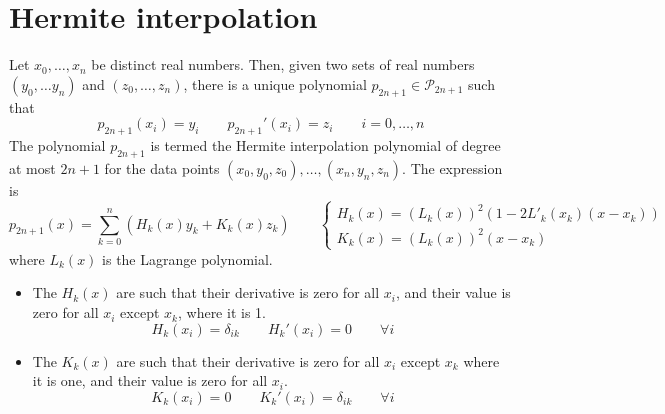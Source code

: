 \documentclass[12pt, openany]{report}
\begin{document}
\section{Hermite interpolation}
Let \(x_0,\dots,x_n\) be distinct real numbers. Then, given two sets of real numbers \((y_0,\dots y_n)\) and \((z_0,\dots,z_n)\), there is a unique polynomial \(p_{2n+1}\in \mathcal{P}_{2n+1}\) such that 
\begin{equation}
    p_{2n+1} (x_i) = y_i \qquad p_{2n+1}'(x_i) =z_i \qquad i=0,\dots,n
\end{equation}
The polynomial \(p_{2n+1}\) is termed the Hermite interpolation polynomial of degree at most \(2n+1\) for the data points \((x_0,y_0,z_0),\dots,(x_n,y_n,z_n)\). The expression is 
\begin{equation}
    p_{2n+1}(x) = \sum_{k=0}^n \left(H_k(x)y_k + K_k(x)z_k\right) \qquad \begin{cases}
        H_k(x) = (L_k(x))^2(1-2L'_k(x_k)(x-x_k))\\
        K_k(x) = (L_k(x))^2(x-x_k)
    \end{cases}
\end{equation}
where \(L_k(x)\) is the Lagrange polynomial.
\begin{itemize}
    \item The \(H_k(x)\) are such that their derivative is zero for all \(x_i\), and their value is zero for all \(x_i\) except \(x_k\), where it is 1.\[H_k(x_i) = \delta_{ik}\qquad H_k'(x_i) = 0 \qquad \forall i\]
    \item The \(K_k(x)\) are such that their derivative is zero for all \(x_i\) except \(x_k\) where it is one, and their value is zero for all \(x_i\).\[K_k(x_i) = 0\qquad K_k'(x_i) = \delta_{ik} \qquad \forall i\]
\end{itemize}
\end{document}
